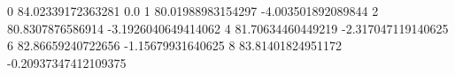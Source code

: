 0 84.02339172363281 0.0
1 80.01988983154297 -4.003501892089844
2 80.8307876586914 -3.1926040649414062
4 81.70634460449219 -2.317047119140625
6 82.86659240722656 -1.15679931640625
8 83.81401824951172 -0.20937347412109375
